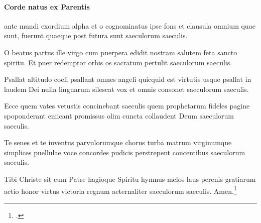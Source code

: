 

\paragraph{Corde natus ex Parentis}
ante mundi exordium
alpha et o cognominatus
ipse fons et clausula
omnium quae sunt, fuerunt
quaeque post futura sunt
saeculorum saeculis.

O beatus partus ille
virgo cum puerpera
edidit nostram salutem
feta sancto spiritu.
Et puer redemptor orbis
os sacratum pertulit
saeculorum saeculis.

Psallat altitudo coeli
psallant omnes angeli
quicquid est virtutis usque
psallat in laudem Dei
nulla linguarum silescat
vox et omnis consonet
saeculorum saeculis.

Ecce quem vates vetustis
concinebant saeculis
quem prophetarum fideles
pagine spoponderant
emicant promissus olim
cuncta collaudent Deum
saeculorum saeculis.

Te senes et te iuventus
parvulorumque chorus
turba matrum virginumque
simplices puellulae
voce concordes pudicis
perstrepent concentibus
saeculorum saeculis.

Tibi Christe sit cum Patre
hagioque Spiritu
hymnus melos laus perenis
gratiarum actio
honor virtus victoria
regnum aeternaliter
saeculorum saeculis.
Amen.\footcite[68r]{bp1502}
